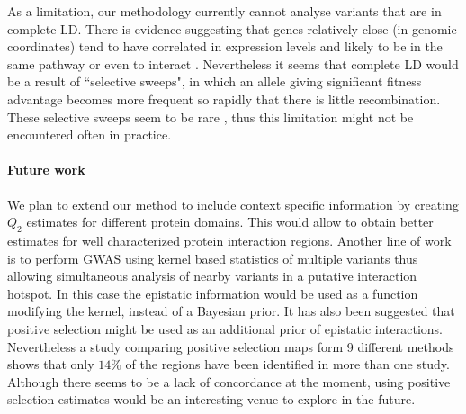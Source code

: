 As a limitation, our methodology currently cannot analyse variants that are in complete LD.
There is evidence suggesting that genes relatively close (in genomic coordinates) tend to have correlated in expression levels and likely to be in the same pathway or even to interact \cite{petkov2005evidence}.
Nevertheless it seems that complete LD would be a result of ``selective sweeps", in which an allele giving significant fitness advantage becomes more frequent so rapidly that there is little recombination.
These selective sweeps seem to be rare \cite{hernandez2011classic}, thus this limitation might not be encountered often in practice.

\paragraph{Future work}
We plan to extend our method to include context specific information by creating $Q_2$ estimates for different protein domains. 
This would allow to obtain better estimates for well characterized protein interaction regions. 
Another line of work is to perform GWAS using kernel based statistics of multiple variants \cite{wu2011rare} thus allowing simultaneous analysis of nearby variants in a putative interaction hotspot. 
In this case the epistatic information would be used as a function modifying the kernel, instead of a Bayesian prior.
It has also been suggested that positive selection might be used as an additional prior of epistatic interactions. 
Nevertheless a study comparing positive selection maps form 9 different methods \cite{akey2009constructing} shows that only $14\%$ of the regions have been identified in more than one study.
Although there seems to be a lack of concordance at the moment, using positive selection estimates would be an interesting venue to explore in the future.
